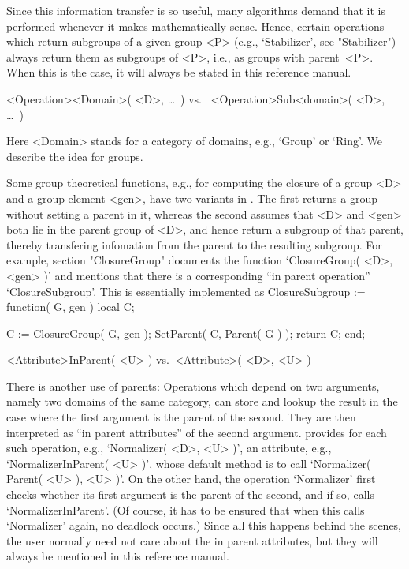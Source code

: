 Since this information transfer is so useful, many algorithms demand that
it is  performed whenever it  makes  mathematically sense. Hence, certain
operations     which  return subgroups  of   a    given  group <P> (e.g.,
`Stabilizer',  see "Stabilizer") always  return them as subgroups of <P>,
i.e., as groups with parent~<P>. When this is the case, it will always be
stated in this reference manual.

\)<Operation><Domain>( <D>, \dots\ ) {\rm vs.}\ %
  <Operation>Sub<domain>( <D>, \dots\ )
%

Here <Domain> stands for a category  of domains, e.g., `Group' or `Ring'.
We describe the idea for groups.

Some  group theoretical functions, e.g.,  for  computing the closure of a
group <D>  and a group  element <gen>, have  two variants in  {\GAP}. The
first returns a group without setting a parent in  it, whereas the second
assumes that <D> and <gen> both lie in the parent group of <D>, and hence
return a subgroup of that parent, thereby transfering infomation from the
parent to   the resulting subgroup.  For example,  section "ClosureGroup"
documents the function `ClosureGroup(   <D>, <gen> )' and  mentions  that
there is a  corresponding ``in parent operation'' `ClosureSubgroup'. This
is essentially implemented as
\begintt
    ClosureSubgroup := function( G, gen )
    local   C;

        C := ClosureGroup( G, gen );
        SetParent( C, Parent( G ) );
        return C;
    end;
\endtt

\)<Attribute>InParent( <U> ) {\rm vs.}\ <Attribute>( <D>, <U> )
%

There   is another use    of  parents: Operations   which  depend on  two
arguments, namely two domains of the same  category, can store and lookup
the result in  the case where  the first  argument is  the  parent of the
second. They are  then interpreted  as ``in  parent attributes'' of   the
second argument.  {\GAP}   provides   for each  such    operation,  e.g.,
`Normalizer(  <D>, <U> )',   an attribute, e.g., `NormalizerInParent( <U>
)', whose default  method is to call `Normalizer(  Parent( <U> ), <U> )'.
On  the other hand, the  operation `Normalizer' first  checks whether its
first  argument is  the  parent   of  the second,   and   if  so,   calls
`NormalizerInParent'. (Of course,  it has to be   ensured that when  this
calls  `Normalizer' again, no  deadlock  occurs.) Since all this  happens
behind the scenes,  the user normally need not  care about the in  parent
attributes, but they will always be mentioned in this reference manual.

